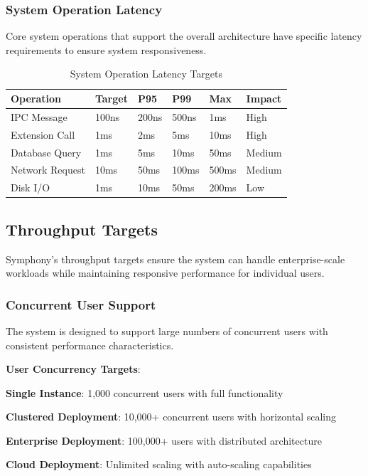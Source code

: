 \subsubsection*{System Operation Latency}

Core system operations that support the overall architecture have specific latency requirements to ensure system responsiveness.

\begin{table}[h]
\centering
\caption{System Operation Latency Targets}
\label{tab:system-latency}
\begin{tabular}{@{}llllll@{}}
\toprule
\textbf{Operation} & \textbf{Target} & \textbf{P95} & \textbf{P99} & \textbf{Max} & \textbf{Impact} \\
\midrule
IPC Message & 100ns & 200ns & 500ns & 1ms & High \\
Extension Call & 1ms & 2ms & 5ms & 10ms & High \\
Database Query & 1ms & 5ms & 10ms & 50ms & Medium \\
Network Request & 10ms & 50ms & 100ms & 500ms & Medium \\
Disk I/O & 1ms & 10ms & 50ms & 200ms & Low \\
\bottomrule
\end{tabular}
\end{table}

\subsection*{Throughput Targets}

Symphony's throughput targets ensure the system can handle enterprise-scale workloads while maintaining responsive performance for individual users.

\subsubsection*{Concurrent User Support}

The system is designed to support large numbers of concurrent users with consistent performance characteristics.

\textbf{User Concurrency Targets}:
\begin{compactlist}
    \item \textbf{Single Instance}: 1,000 concurrent users with full functionality
    \item \textbf{Clustered Deployment}: 10,000+ concurrent users with horizontal scaling
    \item \textbf{Enterprise Deployment}: 100,000+ users with distributed architecture
    \item \textbf{Cloud Deployment}: Unlimited scaling with auto-scaling capabilities
\end{compactlist}

